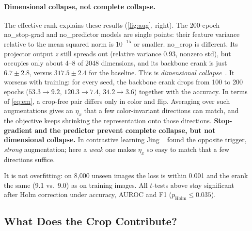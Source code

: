 \documentclass[10pt,twocolumn,letterpaper]{article}
\begin{document}
\paragraph{Dimensional collapse, not complete collapse.}
The effective rank explains these results (\cref{fig:aug}, right).
The 200-epoch no\_stop-grad and no\_predictor models are single points: their feature variance relative to the mean squared norm is $10^{-15}$ or smaller.
no\_crop is different. Its projector output $z$ still spreads out (relative variance 0.93, nonzero std), but occupies only about 4--8 of 2048 dimensions, and its backbone erank is just $6.7\pm2.8$, versus $317.5\pm2.4$ for the baseline.
This is \emph{dimensional collapse}~\cite{jing2022dimensional}.
It worsens with training: for every seed, the backbone erank drops from 100 to 200 epochs ($53.3\rightarrow9.2$, $120.3\rightarrow7.4$, $34.2\rightarrow3.6$) together with the accuracy.
In terms of \cref{eq:em}, a crop-free pair differs only in color and flip. Averaging over such augmentations gives an $\eta_x$ that a few color-invariant directions can match, and the objective keeps shrinking the representation onto those directions.
\textbf{Stop-gradient and the predictor prevent complete collapse, but not dimensional collapse.}
In contrastive learning Jing \etal~\cite{jing2022dimensional} found the opposite trigger, \emph{strong} augmentation; here a \emph{weak} one makes $\eta_x$ so easy to match that a few directions suffice.

It is not overfitting: on 8,000 unseen images the loss is within 0.001 and the erank the same (9.1 vs.\ 9.0) as on training images.
All $t$-tests above stay significant after Holm correction under accuracy, AUROC and F1 ($p_\text{Holm}\le0.035$).

\subsection{What Does the Crop Contribute?}
\label{sec:exp_crop}
\end{document}
